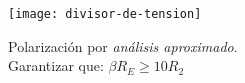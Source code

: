 \documentclass[11pt,a4paper]{article}
\begin{document}
\begin{multicols}{2}
\begin{cajita}
\begin{multicols}{2}
				\vspace{.3cm}
				
				\texttt{[image: divisor-de-tension]}
				
			\end{multicols}
			
			\newpage
			\begin{flushleft}
				Polarización por \textsl{análisis aproximado}.\\[.2cm]
				
				Garantizar que: 	$\beta R_E \geq 10 R_2$
			\end{flushleft}
			
		\end{cajita}

	\end{multicols}
\end{document}
